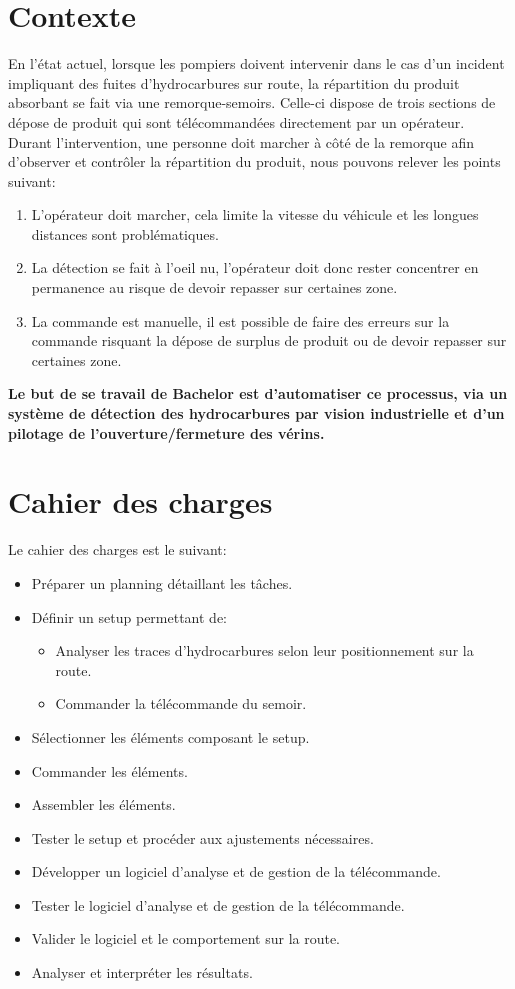 \section{Contexte}
En l'état actuel, lorsque les pompiers doivent intervenir dans le cas d'un incident impliquant des fuites d'hydrocarbures sur route, la répartition
du produit absorbant se fait via une remorque-semoirs. Celle-ci dispose de trois sections de dépose de produit qui sont télécommandées directement par un opérateur.
Durant l'intervention, une personne doit marcher à côté de la remorque afin d'observer et contrôler la répartition du produit, nous pouvons relever les points suivant:
\begin{enumerate}
    \item L'opérateur doit marcher, cela limite la vitesse du véhicule et les longues distances sont problématiques.
    \item La détection se fait à l'oeil nu, l'opérateur doit donc rester concentrer en permanence au risque de devoir repasser sur certaines zone.
    \item La commande est manuelle, il est possible de faire des erreurs sur la commande risquant la dépose de surplus de produit ou de devoir repasser sur certaines zone.
\end{enumerate}
\textbf{Le but de se travail de Bachelor est d'automatiser ce processus, via un système de détection des hydrocarbures par vision industrielle et d'un pilotage de l'ouverture/fermeture des vérins.}
\section{Cahier des charges \label{cdc}}
Le cahier des charges est le suivant:
\begin{itemize}
    \item Préparer un planning détaillant les tâches.
    \item Définir un setup permettant de:
          \begin{itemize}
              \item Analyser les traces d'hydrocarbures selon leur positionnement sur la route.
              \item Commander la télécommande du semoir.
          \end{itemize}
    \item Sélectionner les éléments composant le setup.
    \item Commander les éléments.
    \item Assembler les éléments.
    \item Tester le setup et procéder aux ajustements nécessaires.
    \item Développer un logiciel d'analyse et de gestion de la télécommande.
    \item Tester le logiciel d'analyse et de gestion de la télécommande.
    \item Valider le logiciel et le comportement sur la route.
    \item Analyser et interpréter les résultats.
\end{itemize}
